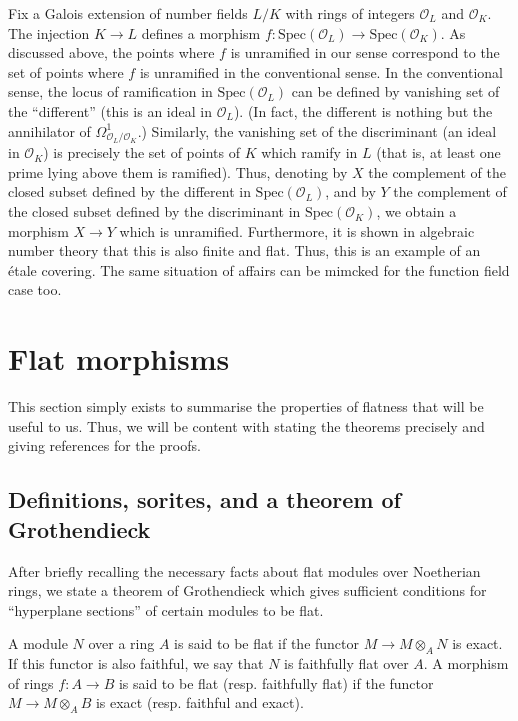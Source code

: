 \begin{example}
\label{example-number-theory-etale}
Fix a Galois extension of number fields $L/K$ with rings of integers $\mathcal{O}_L$
and $\mathcal{O}_K$. The injection $K \to L$ defines a morphism
$f:\text{Spec}(\mathcal{O}_L) \to \text{Spec}(\mathcal{O}_K)$. As discussed above, the points where $f$
is unramified in our sense correspond to the set of points where $f$ is
unramified in the conventional sense. In the conventional sense, the locus of
ramification in $\text{Spec}(\mathcal{O}_L)$ can be defined by vanishing set of the
``different'' (this is an ideal in $\mathcal{O}_L$). (In fact, the different is
nothing but the annihilator of $\Omega^1_{\mathcal{O}_L/\mathcal{O}_K}$.) Similarly, the
vanishing set of the discriminant (an ideal in $\mathcal{O}_K$) is precisely the set
of points of $K$ which ramify in $L$ (that is, at least one prime lying above
them is ramified). Thus, denoting by $X$ the complement of the closed subset
defined by the different in $\text{Spec}(\mathcal{O}_L)$, and by $Y$ the complement of the
closed subset defined by the discriminant in $\text{Spec}(\mathcal{O}_K)$, we obtain a
morphism $X \to Y$ which is unramified. Furthermore, it is shown in algebraic
number theory that this is also finite and flat. Thus, this is an example of
an \'etale covering. The same situation of affairs can be mimcked for the
function field case too.
\end{example}

\section{Flat morphisms}
\label{section-flat-moprhisms}

\noindent
This section simply exists to summarise the properties of flatness that will
be useful to us. Thus, we will be content with stating the theorems precisely
and giving references for the proofs.

\subsection{Definitions, sorites, and a theorem of Grothendieck}
\label{subsection-definition-flat}

\noindent
After briefly recalling the necessary facts about flat modules over Noetherian
rings, we state a theorem of Grothendieck which gives sufficient conditions
for ``hyperplane sections'' of certain modules to be flat.

\begin{definition}
\label{definition-flat-rings}
A module $N$ over a ring $A$ is said to be flat if the functor
$M \to M \otimes_A N$ is exact. If this functor is also faithful, we say that
$N$ is faithfully flat over $A$. A morphism of rings $f:A \to B$ is said to be
flat (resp. faithfully flat) if the functor $M \to M \otimes_A B$ is exact
(resp. faithful and exact). 
\end{definition}

